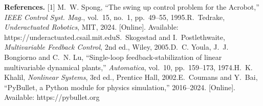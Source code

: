 \documentclass[10pt,letterpaper]{article}
\newenvironment{keep}{\par\noindent\begin{minipage}{\linewidth}}{\end{minipage}\par\smallskip}
\begin{document}
\begin{keep}
\vspace{6pt}
\begin{singlespace}
{\footnotesize
\textbf{References.}
[1] M.~W. Spong, ``The swing up control problem for the Acrobot,'' \emph{IEEE Control Syst. Mag.}, vol.~15, no.~1, pp.~49--55, 1995.\quad
[2] R.~Tedrake, \emph{Underactuated Robotics}, MIT, 2024. [Online]. Available: https://underactuated.csail.mit.edu\quad
[3] S.~Skogestad and I.~Postlethwaite, \emph{Multivariable Feedback Control}, 2nd ed., Wiley, 2005.\quad
[4] D.~C. Youla, J.~J. Bongiorno and C.~N. Lu, ``Single-loop feedback-stabilization of linear multivariable dynamical plants,'' \emph{Automatica}, vol.~10, pp.~159--173, 1974.\quad
[5] H.~K. Khalil, \emph{Nonlinear Systems}, 3rd ed., Prentice Hall, 2002.\quad
[6] E.~Coumans and Y.~Bai, ``PyBullet, a Python module for physics simulation,'' 2016--2024. [Online]. Available: https://pybullet.org\par}
\end{singlespace}
\end{keep}
\end{document}
